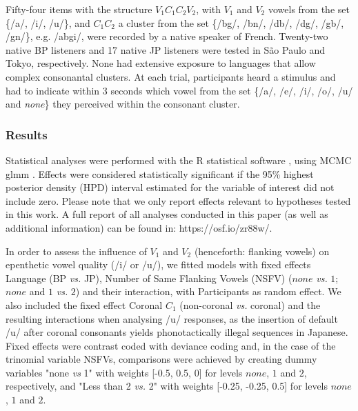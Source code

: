Fifty-four items with the structure $V_{1}C_{1}C_{2}V_{2}$, with $V_{1}$ and $V_{2}$ vowels from the set \{/a/, /i/, /u/\}, and $C_{1}C_{2}$ a cluster from the set \{/bg/, /bn/, /db/, /dg/, /gb/, /gn/\}, e.g. /abgi/, were recorded by a native speaker of French. Twenty-two native BP listeners and 17 native JP listeners were tested in S\~{a}o Paulo and Tokyo, respectively. None had extensive exposure to languages that allow complex consonantal clusters. At each trial, participants heard a stimulus and had to indicate within 3 seconds which vowel from the set \{/a/, /e/, /i/, /o/, /u/ and \textit{none}\} they perceived within the consonant cluster. 

\subsubsection{Results}
Statistical analyses were performed with the R statistical software \cite{R-base}, using MCMC glmm \cite{R-MCMCglmm, R-coda}. Effects were considered statistically significant if the 95\% highest posterior density (HPD) interval estimated for the variable of interest did not include zero. Please note that we only report effects relevant to hypotheses tested in this work. A full report of all analyses conducted in this paper (as well as additional information) can be found in: https://osf.io/zr88w/.

In order to assess the influence of $V_{1}$ and $V_{2}$ (henceforth: flanking vowels) on epenthetic vowel quality (/i/ or /u/), we fitted models with fixed effects Language (BP \textit{vs.} JP), Number of Same Flanking Vowels (NSFV) ($none$ \textit{vs.} $1$; $none$ and $1$ \textit{vs.} $2$) and their interaction, with Participants as random effect. We also included the fixed effect Coronal $C_{1}$ (non-coronal \textit{vs.} coronal) and the resulting interactions when analysing /u/ responses, as the insertion of default /u/ after coronal consonants yields phonotactically illegal sequences in Japanese. Fixed effects were contrast coded with deviance coding and, in the case of the trinomial variable NSFVs, comparisons were achieved by creating dummy variables "none \textit{vs} 1" with weights [-0.5, 0.5, 0] for levels $none$, $1$ and $2$, respectively, and "Less than 2 \textit{vs.} 2" with weights [-0.25, -0.25, 0.5] for levels $none$, $1$ and $2$.

